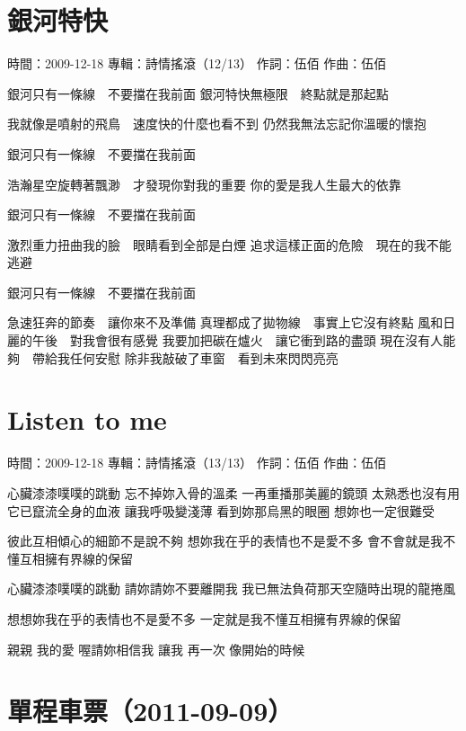\documentclass[UTF8,a4paper,oneside,twocolumn,12pt]{ctexbook}
\newcommand{\infopair}[2]{\textbullet #1：#2}
\newcommand{\zc}[1][伍佰]{\infopair{作詞}{#1}}
\newcommand{\zq}[1][伍佰]{\infopair{作曲}{#1}}
\newcommand{\zj}[1]{\infopair{專輯}{#1}}
\newcommand{\sj}[1]{\infopair{時間}{#1}}
\newenvironment{info}{\begin{flushleft}\kaishu
	}
	{\end{flushleft}\normalsize\yahei\par}
\newenvironment{lyric}{
	}
{}
\begin{document}
\section{銀河特快}
\begin{info}
	\sj{2009-12-18}
	\zj{詩情搖滾（12/13）}
	\zc
	\zq
\end{info}
\begin{lyric}
	銀河只有一條線　不要擋在我前面
	銀河特快無極限　終點就是那起點

	我就像是噴射的飛鳥　速度快的什麼也看不到
	仍然我無法忘記你溫暖的懷抱

	銀河只有一條線　不要擋在我前面

	浩瀚星空旋轉著飄渺　才發現你對我的重要
	你的愛是我人生最大的依靠

	銀河只有一條線　不要擋在我前面

	激烈重力扭曲我的臉　眼睛看到全部是白煙
	追求這樣正面的危險　現在的我不能逃避

	銀河只有一條線　不要擋在我前面

	急速狂奔的節奏　讓你來不及準備
	真理都成了拋物線　事實上它沒有終點
	風和日麗的午後　對我會很有感覺
	我要加把碳在爐火　讓它衝到路的盡頭
	現在沒有人能夠　帶給我任何安慰
	除非我敲破了車窗　看到未來閃閃亮亮
\end{lyric}

\section{Listen to me}
\begin{info}
	\sj{2009-12-18}
	\zj{詩情搖滾（13/13）}
	\zc
	\zq
\end{info}
\begin{lyric}
	心臟漆漆噗噗的跳動 忘不掉妳入骨的溫柔
	一再重播那美麗的鏡頭 太熟悉也沒有用
	它已竄流全身的血液 讓我呼吸變淺薄
	看到妳那烏黑的眼圈 想妳也一定很難受

	彼此互相傾心的細節不是說不夠
	想妳我在乎的表情也不是愛不多
	會不會就是我不懂互相擁有界線的保留

	心臟漆漆噗噗的跳動 請妳請妳不要離開我
	我已無法負荷那天空隨時出現的龍捲風

	想想妳我在乎的表情也不是愛不多
	一定就是我不懂互相擁有界線的保留

	親親 我的愛 喔請妳相信我
	讓我 再一次 像開始的時候
\end{lyric}

\section*{單程車票（2011-09-09）}
\end{document}
